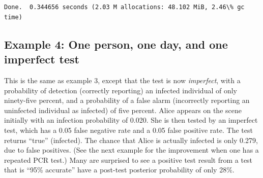 \documentclass[11pt]{article}
\begin{document}
    \begin{center}
    \end{center}
    { \hspace*{\fill} \\}
    
    \begin{Verbatim}[commandchars=\\\{\}]

Done.  0.344656 seconds (2.03 M allocations: 48.102 MiB, 2.46\% gc time)
    \end{Verbatim}
\newpage
    \hypertarget{example-4-one-person-one-day-and-one-imperfect-test}{%
\subsection{Example 4: One person, one day, and one imperfect
test}\label{example-4-one-person-one-day-and-one-imperfect-test}}

This is the same as example 3, except that the test is now
\emph{imperfect}, with a probability of detection (correctly reporting)
an infected individual of only ninety-five percent, and a probability of
a false alarm (incorrectly reporting an uninfected individual as
infected) of five percent. Alice appears on the scene initially with an
infection probability of 0.020. She is then tested by an imperfect test,
which has a 0.05 false negative rate and a 0.05 false positive rate. The
test returns ``true'' (infected). The chance that Alice is actually
infected is only 0.279, due to false positives. (See the next example
for the improvement when one has a repeated PCR test.) Many are
surprised to see a positive test result from a test that is ``95\%
accurate'' have a post-test posterior probability of only 28\%.
\end{document}
